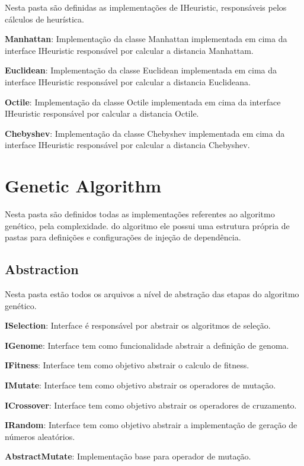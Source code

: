 Nesta pasta são definidas as implementações de IHeuristic, responsáveis pelos cálculos de heurística.

\textbf{Manhattan}: Implementação da classe Manhattan implementada em cima da interface IHeuristic responsável por calcular a distancia Manhattam.

\textbf{Euclidean}: Implementação da classe Euclidean implementada em cima da interface IHeuristic responsável por calcular a distancia Euclideana.

\textbf{Octile}: Implementação da classe Octile implementada em cima da interface IHeuristic responsável por calcular a distancia Octile.

\textbf{Chebyshev}: Implementação da classe Chebyshev implementada em cima da interface IHeuristic responsável por calcular a distancia Chebyshev.

\section{Genetic Algorithm}

Nesta pasta são definidos todas as implementações referentes ao algoritmo genético, pela complexidade.
do algoritmo ele possui uma estrutura própria de pastas para definições e configurações de injeção de dependência.

\subsection{Abstraction}

Nesta pasta estão todos os arquivos a nível de abstração das etapas do algoritmo genético.

\textbf{ISelection}: Interface é responsável por abstrair os algoritmos de seleção.

\textbf{IGenome}: Interface tem como funcionalidade abstrair a definição de genoma.

\textbf{IFitness}: Interface tem como objetivo abstrair o calculo de fitness.

\textbf{IMutate}: Interface tem como objetivo abstrair os operadores de mutação.

\textbf{ICrossover}:  Interface tem como objetivo abstrair os operadores de cruzamento.

\textbf{IRandom}: Interface tem como objetivo abstrair a implementação de geração de números aleatórios.

\textbf{AbstractMutate}: Implementação base para operador de mutação.

